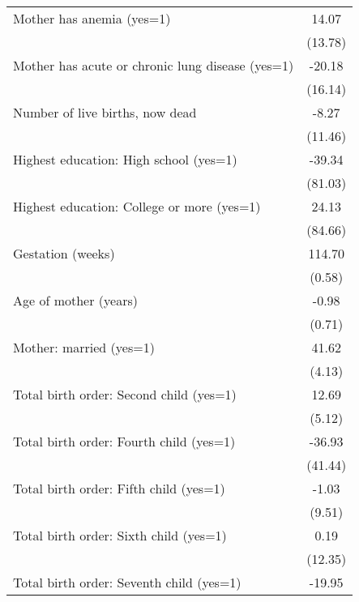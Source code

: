 {\begin{tabular}{l*{1}{c}}
Mother has anemia (yes=1)                         &       14.07\\
                                                  &     (13.78)\\
Mother has acute or chronic lung disease (yes=1)  &      -20.18\\
                                                  &     (16.14)\\
Number of live births, now dead                   &       -8.27\\
                                                  &     (11.46)\\
Highest education: High school (yes=1)            &      -39.34\\
                                                  &     (81.03)\\
Highest education: College or more (yes=1)        &       24.13\\
                                                  &     (84.66)\\
Gestation (weeks)                                 &      114.70\\
                                                  &      (0.58)\\
Age of mother (years)                             &       -0.98\\
                                                  &      (0.71)\\
Mother: married (yes=1)                           &       41.62\\
                                                  &      (4.13)\\
Total birth order: Second child (yes=1)           &       12.69\\
                                                  &      (5.12)\\
Total birth order: Fourth child (yes=1)           &      -36.93\\
                                                  &     (41.44)\\
Total birth order: Fifth child (yes=1)            &       -1.03\\
                                                  &      (9.51)\\
Total birth order: Sixth child (yes=1)            &        0.19\\
                                                  &     (12.35)\\
Total birth order: Seventh child (yes=1)          &      -19.95\\

\end{tabular}}
